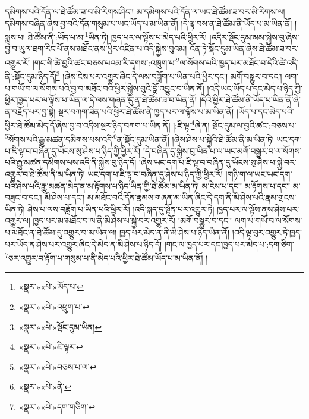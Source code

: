 དམིགས་པའི་དོན་ལ་ཐེ་ཚོམ་ཟ་བ་མི་རིགས་ཤིང་། མ་དམིགས་པའི་དོན་ལ་ཡང་ཐེ་ཚོམ་ཟ་བར་མི་རིགས་ལ། དམིགས་བཞིན་ཞེས་བྱ་བའི་དོན་གསུམ་པ་ཡང་ཡོད་པ་མ་ཡིན་ནོ། །དེ་ལྟ་བས་ན་ཐེ་ཚོམ་ནི་ཡོད་པ་མ་ཡིན་ནོ། །སྨྲས་པ། ཐེ་ཚོམ་ནི་:ཡོད་པ་མ་\footnote{«སྣར་»«པེ་»ཡོད་པ་}ཡིན་ཏེ། ཁྱད་པར་ལ་ལྟོས་པ་མེད་པའི་ཕྱིར་རོ། །འདིར་སྡོང་དུམ་མམ་སྐྱེས་བུ་ཞེས་བྱ་བ་ཡུལ་ཐག་རིང་པོ་ནས་མཐོང་ནས་ཕྱིར་འཛིན་པ་འདི་སྐྱེས་བུའམ། འོན་ཏེ་སྡོང་དུམ་ཡིན་ཞེས་ཐེ་ཚོམ་ཟ་བར་འགྱུར་རོ། །གང་གི་ཚེ་བྱའི་ཚང་བཅས་པའམ་རི་དྭགས་:འཁྲུག་པ་\footnote{«སྣར་»«པེ་»འཕྲུག་པ་}ལ་སོགས་པའི་ཁྱད་པར་མཐོང་བ་དེའི་ཚེ་འདི་ནི་:སྡོང་དུམ་ཉིད་དོ།\footnote{«སྣར་»«པེ་»སྡོང་དུམ་ཡིན།} །ཞེས་ངེས་པར་འགྱུར་ཞིང་དེ་ལས་བཟློག་པ་ཡིན་པའི་ཕྱིར་དང་། མགོ་བསྒྱུར་བ་དང་། ལག་པ་གཡོ་བ་ལ་སོགས་པའི་བྱ་བ་མཐོང་བའི་ཕྱིར་སྐྱེས་བུའི་བློ་འབྱུང་བ་ཡིན་ནོ། །འདི་ཡང་ཡོད་པ་དང་མེད་པ་ཉིད་ཀྱི་ཕྱིར་ཁྱད་པར་ལ་ལྟོས་པ་ཡིན་ལ་དེ་ལས་གཞན་དུ་ན་ཐེ་ཚོམ་ཟ་བ་ཡིན་ནོ། །དེའི་ཕྱིར་ཐེ་ཚོམ་ནི་ཡོད་པ་ཡིན་ནོ་ཞེ་ན་བརྗོད་པར་བྱ་སྟེ། སྔར་བཀག་ཟིན་པའི་ཕྱིར་ཐེ་ཚོམ་ནི་ཁྱད་པར་ལ་ལྟོས་པ་མ་ཡིན་ནོ། །ཡོད་པ་དང་མེད་པའི་ཕྱིར་ཐེ་ཚོམ་མེད་དོ་ཞེས་བྱ་བ་འདིས་སྔར་ཉིད་བཀག་པ་ཡིན་ནོ། །:ཇི་ལྟ་\footnote{«སྣར་»«པེ་»ཇི་ལྟར་}ཞེ་ན། སྡོང་དུམ་ལ་བྱའི་ཚང་:བཅས་པ་\footnote{«སྣར་»«པེ་»བཅས་པ་ལ་}སོགས་པའི་རྒྱུ་མཚན་དམིགས་པས་འདི་\footnote{«སྣར་»«པེ་»ནི་}ན་སྡོང་དུམ་ཡིན་ནོ། །ཞེས་ཤེས་པ་སྐྱེའི་ཐེ་ཚོམ་ནི་མ་ཡིན་ཏེ། ཡང་དག་པ་ཇི་ལྟ་བ་བཞིན་དུ་ཡོངས་སུ་ཤེས་པ་ཉིད་ཀྱི་ཕྱིར་རོ། །དེ་བཞིན་དུ་སྐྱེས་བུ་ཡིན་པ་ལ་ཡང་མགོ་བསྒྱུར་བ་ལ་སོགས་པའི་རྒྱུ་མཚན་དམིགས་པས་འདི་ནི་སྐྱེས་བུ་ཉིད་དོ། །ཞེས་ཡང་དག་པ་ཇི་ལྟ་བ་བཞིན་དུ་ཡོངས་སུ་ཤེས་པ་སྐྱེ་བར་འགྱུར་བ་ཐེ་ཚོམ་ནི་མ་ཡིན་ཏེ། ཡང་དག་པ་ཇི་ལྟ་བ་བཞིན་དུ་ཤེས་པ་ཉིད་ཀྱི་ཕྱིར་རོ། །གཉི་ག་ལ་ཡང་ཡང་དག་པའི་ཤེས་པའི་རྒྱུ་མཚན་མེད་ན་མ་རྟོགས་པ་ཉིད་ཡིན་གྱི་ཐེ་ཚོམ་མ་ཡིན་ཏེ། མ་ངེས་པ་དང་། མ་རྟོགས་པ་དང་། མ་བཟུང་བ་དང་། མི་ཤེས་པ་དང་། མ་མཐོང་བའི་དོན་རྣམས་གཞན་མ་ཡིན་ཞིང་དེ་དག་ནི་མི་ཤེས་པའི་རྣམ་གྲངས་ཡིན་ཏེ། ཤེས་པ་ལས་བཟློག་པ་ཡིན་པའི་ཕྱིར་རོ། །འདི་སྐད་དུ་སྟོན་པར་འགྱུར་ཏེ། ཁྱད་པར་ལ་ལྟོས་ནས་ཤེས་པར་འགྱུར་ལ། ཁྱད་པར་མ་མཐོང་བ་ལ་ནི་མི་ཤེས་པ་སྐྱེ་བར་འགྱུར་རོ། །མགོ་བསྒྱུར་བ་དང་། ལག་པ་གཡོ་བ་ལ་སོགས་པ་མཐོང་ན་ཐེ་ཚོམ་དུ་འགྱུར་བ་མ་ཡིན་ལ། ཁྱད་པར་མེད་ན་ནི་མི་ཤེས་པ་ཉིད་ཡིན་ནོ། །འདི་ལྟ་བུར་འགྱུར་ཏེ་ཁྱད་པར་ཡོད་ན་ཤེས་པར་འགྱུར་ཞིང་དེ་མེད་ན་མི་ཤེས་པ་ཉིད་དོ། །གང་ལ་ཁྱད་པར་དང་ཁྱད་པར་མེད་པ་:དག་ཅིག་\footnote{«སྣར་»«པེ་»དག་གཅིག་}ཅར་འགྱུར་བ་རྟོག་པ་གསུམ་པ་ནི་མེད་པའི་ཕྱིར་ཐེ་ཚོམ་ཡོད་པ་མ་ཡིན་ནོ། །
